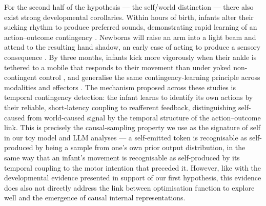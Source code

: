 \documentclass[12pt, a4paper]{article}
\begin{document}
For the second half of the hypothesis --- the self/world distinction --- there also exist
strong developmental corollaries. Within hours of birth, infants alter their sucking rhythm
to produce preferred sounds, demonstrating rapid learning of an action--outcome contingency
\citep{decasper2009lateralized}. Newborns will raise an arm into a light beam and attend to
the resulting hand shadow, an early case of acting to produce a sensory consequence
\citep{vandermeer1997limelight}. By three months, infants kick more vigorously when their
ankle is tethered to a mobile that responds to their movement than under yoked
non-contingent control \citep{rovee1969conjugate}, and generalise the same
contingency-learning principle across modalities and effectors \citep{lee2013contingent}.
The mechanism proposed across these studies is temporal contingency detection: the infant
learns to identify its own actions by their reliable, short-latency coupling to reafferent
feedback, distinguishing self-caused from world-caused signal by the temporal structure of
the action--outcome link. This is precisely the causal-sampling property we use as the
signature of self in our toy model and LLM analyses --- a self-emitted token is recognisable
as self-produced by being a sample from one's own prior output distribution, in the same
way that an infant's movement is recognisable as self-produced by its temporal coupling to
the motor intention that preceded it. However, like with the developmental evidence
presented in support of our first hypothesis, this evidence does also not directly address
the link between optimisation function to explore well and the emergence of causal internal
representations.
\end{document}
